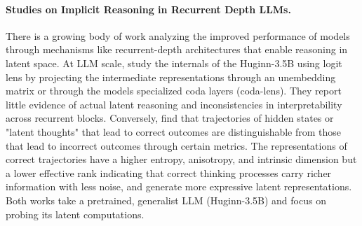\paragraph{Studies on Implicit Reasoning in Recurrent Depth LLMs.} There is a growing body of work analyzing the improved performance of models through mechanisms like recurrent-depth architectures that enable reasoning in latent space. At LLM scale, \citet{lu2025latent} study the internals of the Huginn-3.5B using logit lens by projecting the intermediate representations through an unembedding matrix or through the models specialized coda layers (coda-lens). They report little evidence of actual latent reasoning and inconsistencies in interpretability across recurrent blocks. Conversely, \citet{du2025latent} find that trajectories of hidden states or "latent thoughts" that lead to correct outcomes are distinguishable from those that lead to incorrect outcomes through certain metrics. The representations of correct trajectories have a higher entropy, anisotropy, and intrinsic dimension but a lower effective rank indicating that correct thinking processes carry richer information with less noise, and generate more expressive latent representations. Both works take a pretrained, generalist LLM (Huginn-3.5B) and focus on probing its latent computations.  

